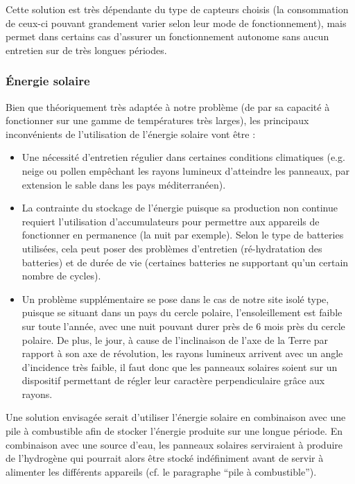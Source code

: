 
Cette solution est très dépendante du type de capteurs choisis (la consommation de ceux-ci pouvant grandement varier selon leur mode de fonctionnement), mais permet dans certains cas d'assurer un fonctionnement autonome sans aucun entretien sur de très longues périodes.

\subsubsection{Énergie solaire}

Bien que théoriquement très adaptée à notre problème (de par sa capacité à fonctionner sur une gamme de températures très larges), les principaux inconvénients de l'utilisation de l'énergie solaire vont être :

\begin{itemize}
\item Une nécessité d'entretien régulier dans certaines conditions climatiques (e.g. neige ou pollen empêchant les rayons lumineux d'atteindre les panneaux, par extension le sable dans les pays méditerranéen).
\item La contrainte du stockage de l'énergie puisque sa production non continue requiert l'utilisation d'accumulateurs pour permettre aux appareils de fonctionner en permanence (la nuit par exemple). Selon le type de batteries utilisées, cela peut poser des problèmes d'entretien (ré-hydratation des batteries) et de durée de vie (certaines batteries ne supportant qu'un certain nombre de cycles).
\item Un problème supplémentaire se pose dans le cas de notre site isolé type, puisque se situant dans un pays du cercle polaire, l'ensoleillement est faible sur toute l'année, avec une nuit pouvant durer près de 6 mois près du cercle polaire. De plus, le jour, à cause de l'inclinaison de l'axe de la Terre par rapport à son axe de révolution, les rayons lumineux arrivent avec un angle d'incidence très faible, il faut donc que les panneaux solaires soient sur un dispositif permettant de régler leur caractère perpendiculaire grâce aux rayons.
\end{itemize}

Une solution envisagée serait d'utiliser l'énergie solaire en combinaison avec une pile à combustible afin de stocker l'énergie produite sur une longue période. En combinaison avec une source d'eau, les panneaux solaires serviraient à produire de l'hydrogène qui pourrait alors être stocké indéfiniment avant de servir à alimenter les différents appareils (cf. le paragraphe ``pile à combustible'').


